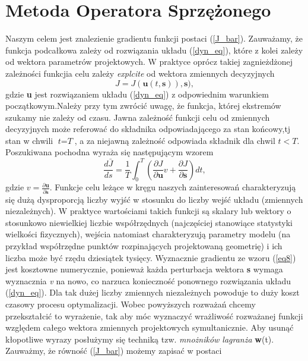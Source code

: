 \documentclass[12pt, twoside]{book}
\begin{document}
\section{Metoda Operatora Sprzężonego}
Naszym celem jest znalezienie gradientu funkcji postaci (\ref{J_bar}). Zauważamy, że funkcja podcałkowa zależy od rozwiązania układu (\ref{dyn_eq}), które z kolei zależy od wektora parametrów projektowych. W praktyce oprócz takiej zagnieżdżonej zależności funkcjia celu zależy \textit{explcite} od wektora zmiennych decyzyjnych
\begin{equation}
J = J(\textbf{u}(t,\textbf{s})),\textbf{s}),
\label{eq7}
\end{equation}
gdzie \textbf{u} jest rozwiązaniem układu (\ref{dyn_eq}) z odpowiednim warunkiem początkowym.\newline Należy przy tym zwrócić uwagę, że funkcja, której ekstremów szukamy nie zależy od czasu. Jawna zależność funkcji celu od zmiennych decyzyjnych może referować do składnika odpowiadającego za stan końcowy,tj  stan w chwili $\textit{t} = \textit{T}$, a za niejawną zależność odpowiada składnik dla chwil $\textit{t} < \textit{T}.$  \newline
Poszukiwana pochodna wyraża się następującym wzorem
\begin{equation}
\frac{d\bar{J}}{ds} = \frac{1}{T}\int_{0}^{T}(\frac{\partial{J}}{\partial \textbf{u}}v+\frac{\partial{J}}{\partial \textbf{s}})dt,
\label{eq8}
\end{equation}
gdzie $v = \frac{\partial\textbf{u}}{\partial \textbf{s}}.$ Funkcje celu leżące w kręgu naszych zainteresowań charakteryzują się dużą dysproporcją liczby wyjść w stosunku do liczby wejść układu (zmiennych niezależnych). W praktyce wartościami takich funkcji są skalary lub wektory o stosunkowo niewielkiej liczbie współrzędnych (najczęściej stanowiące statystyki wielkości fizycznych), wejścia natomiast charakteryzują parametry modelu (na przykład współrzędne punktów rozpinających projektowaną geometrię) i ich liczba może być rzędu dziesiątek tysięcy. Wyznacznie gradientu ze wzoru (\ref{eq8}) jest kosztowne numerycznie, ponieważ każda perturbacja wektora \textbf{s} wymaga wyznacznia \textit{v} na nowo, co narzuca konieczność ponownego rozwiązania układu (\ref{dyn_eq}). Dla tak dużej liczby zmiennych niezależnych powoduje to duży koszt czasowy procesu optymalizacji.\newline 
Wobec powyższych rozważań chcemy przekształcić to wyrażenie, tak aby móc wyznaczyć wrażliwość rozważanej funkcji względem całego wektora zmiennych projektowych symultanicznie. Aby usunąć kłopotliwe wyrazy posłużymy się techniką tzw. \textit{mnożników lagranża} \textbf{w}(t). Zauważmy, że równość (\ref{J_bar}) możemy zapisać w postaci 
\end{document}
